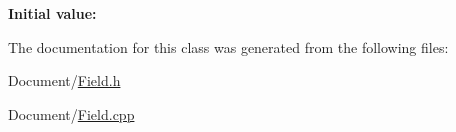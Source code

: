 {\bfseries Initial value\+:}
\begin{DoxyCode}
\DoxyCodeLine{= []() \{}
\DoxyCodeLine{\}()}
\end{DoxyCode}


The documentation for this class was generated from the following files\+:\begin{DoxyCompactItemize}
\item 
Document/\mbox{\hyperlink{Document_2Field_8h}{Field.\+h}}\item 
Document/\mbox{\hyperlink{Field_8cpp}{Field.\+cpp}}\end{DoxyCompactItemize}
